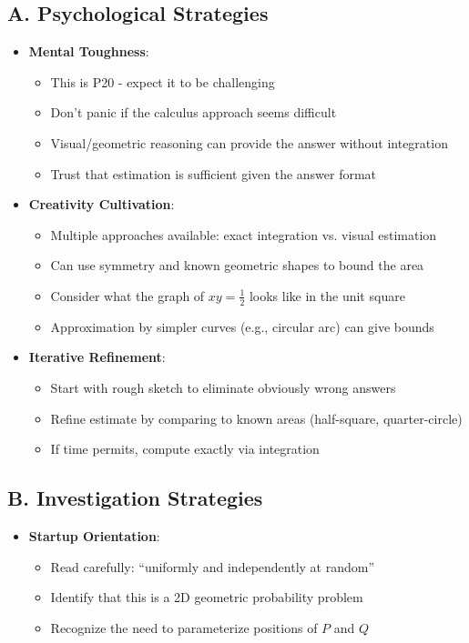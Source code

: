 \documentclass[11pt]{article}
\begin{document}
\begin{strategicbox}
\subsection*{A. Psychological Strategies}
\begin{itemize}[leftmargin=*]
    \item \textbf{Mental Toughness}: 
    \begin{itemize}
        \item This is P20 - expect it to be challenging
        \item Don't panic if the calculus approach seems difficult
        \item Visual/geometric reasoning can provide the answer without integration
        \item Trust that estimation is sufficient given the answer format
    \end{itemize}
    
    \item \textbf{Creativity Cultivation}: 
    \begin{itemize}
        \item Multiple approaches available: exact integration vs. visual estimation
        \item Can use symmetry and known geometric shapes to bound the area
        \item Consider what the graph of $xy = \frac{1}{2}$ looks like in the unit square
        \item Approximation by simpler curves (e.g., circular arc) can give bounds
    \end{itemize}
    
    \item \textbf{Iterative Refinement}: 
    \begin{itemize}
        \item Start with rough sketch to eliminate obviously wrong answers
        \item Refine estimate by comparing to known areas (half-square, quarter-circle)
        \item If time permits, compute exactly via integration
    \end{itemize}
\end{itemize}

\subsection*{B. Investigation Strategies}
\begin{itemize}[leftmargin=*]
    \item \textbf{Startup Orientation}: 
    \begin{itemize}
        \item Read carefully: ``uniformly and independently at random''
        \item Identify that this is a 2D geometric probability problem
        \item Recognize the need to parameterize positions of $P$ and $Q$
    \end{itemize}
    

\end{itemize}
\end{strategicbox}
\end{document}
